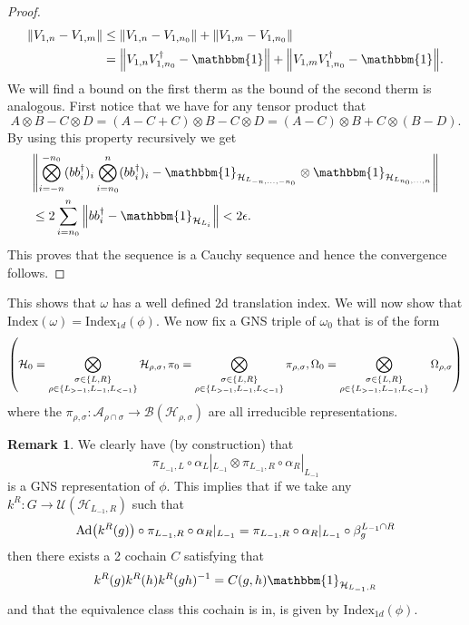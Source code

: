 \documentclass[12pt,a4paper,twoside]{article}
\let\originalleft\left
\let\originalright\right
\renewcommand{\left}{\mathopen{}\mathclose\bgroup\originalleft}
\renewcommand{\right}{\aftergroup\egroup\originalright}
\newcommand{\UU}{\mathcal U}
\newcommand{\BB}{\mathcal B}
\newcommand{\HH}{\mathcal H}
\renewcommand{\AA}{\mathcal A}
\newcommand{\id}{\mathbbm{1}}
\newcommand{\Ad}[1]{\textrm{Ad}\left(#1\right)}
\theoremstyle{definition}
\newtheorem{remark}[theorem]{Remark}
\numberwithin{equation}{section}
\begin{document}
\begin{proof}
	\begin{align}
		\norm{V_{1,n}-V_{1,m}}&\leq \norm{V_{1,n}-V_{1,n_0}}+\norm{V_{1,m}-V_{1,n_0}}\\
		&=\norm{V_{1,n}V_{1,n_0}^\dagger-\id}+\norm{V_{1,m}V_{1,n_0}^\dagger-\id}.
	\end{align}
	We will find a bound on the first therm as the bound of the second therm is analogous. First notice that we have for any tensor product that
	\begin{equation}
		A\otimes B-C\otimes D=(A-C+C)\otimes B-C\otimes D=(A-C)\otimes B+C\otimes (B-D).
	\end{equation}
	By using this property recursively we get
	\begin{align}
	&\norm{\bigotimes_{i=-n}^{-n_0}(bb_i^\dagger)_i\bigotimes_{i=n_0}^{n}(bb_i^\dagger)_i-\id_{\HH_{L_{-n,\ldots,-n_0}}}\otimes\id_{\HH_{L_{n_0,\ldots,n}}}}\\
	&\leq 2\sum_{i=n_0}^{n}\norm{bb_i^\dagger-\id_{\HH_{L_i}}}<2\epsilon.
	\end{align}
	This proves that the sequence is a Cauchy sequence and hence the convergence follows.
\end{proof}
This shows that $\omega$ has a well defined 2d translation index. We will now show that $\textrm{Index}(\omega)=\textrm{Index}_{1d}(\phi)$. We now fix a GNS triple of $\omega_0$ that is of the form
\begin{equation}
	\left(\HH_0=\bigotimes_{\substack{\sigma\in\{L,R\}\\ \rho\in\{L_{>-1},L_{-1},L_{<-1}\}}}\HH_{\rho,\sigma},\pi_0=\bigotimes_{\substack{\sigma\in\{L,R\}\\ \rho\in\{L_{>-1},L_{-1},L_{<-1}\}}}\pi_{\rho,\sigma},\Omega_0=\bigotimes_{\substack{\sigma\in\{L,R\}\\ \rho\in\{L_{>-1},L_{-1},L_{<-1}\}}}\Omega_{\rho,\sigma}\right)
\end{equation}
where the $\pi_{\rho,\sigma}:\AA_{\rho\cap\sigma}\rightarrow\BB(\HH_{\rho,\sigma})$ are all irreducible representations.
\begin{remark}\label{rem:GNS_One_Dimensional}
	We clearly have (by construction) that
	\begin{equation}
		\pi_{L_{-1},L}\circ\alpha_L|_{L_{-1}}\otimes \pi_{L_{-1},R}\circ\alpha_R|_{L_{-1}}
	\end{equation}
	is a GNS representation of $\phi$. This implies that if we take any $k^R:G\rightarrow \UU(\HH_{L_{-1},R})$ such that
	\begin{equation}
		\Ad{k^R(g)}\circ\pi_{L_{-1},R}\circ\alpha_R|_{L_{-1}}=\pi_{L_{-1},R}\circ\alpha_R|_{L_{-1}}\circ\beta_{g}^{L_{-1}\cap R}
	\end{equation}
	then there exists a 2 cochain $C$ satisfying that
	\begin{equation}
		k^R(g)k^R(h)k^R(gh)^{-1}=C(g,h)\id_{\HH_{L_{-1},R}}
	\end{equation}
	and that the equivalence class this cochain is in, is given by $\textrm{Index}_{1d}(\phi)$.
\end{remark}
\end{document}
